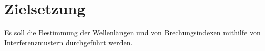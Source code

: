 
\section{Zielsetzung}
\label{sec:Zielsetzung}
Es soll die Bestimmung der Wellenlängen und von Brechungsindexen mithilfe von Interferenzmustern durchgeführt werden.
